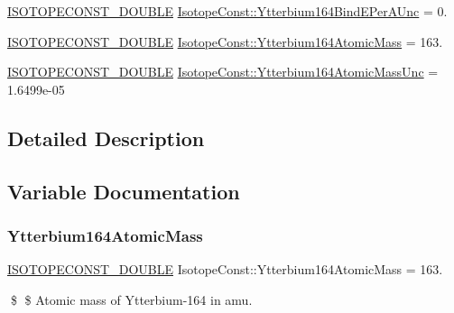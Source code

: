 \begin{DoxyCompactItemize}
\mbox{\hyperlink{group___isotope_const-_macros_ga8f45a7272ce02c0b4c65c44636ed719a}{I\+S\+O\+T\+O\+P\+E\+C\+O\+N\+S\+T\+\_\+\+D\+O\+U\+B\+LE}} \mbox{\hyperlink{group___isotope_const-_ytterbium-_yb164_ga0a419a6da4e8a57344887a1e27026556}{Isotope\+Const\+::\+Ytterbium164\+Bind\+E\+Per\+A\+Unc}} = 0.
\item 
\mbox{\hyperlink{group___isotope_const-_macros_ga8f45a7272ce02c0b4c65c44636ed719a}{I\+S\+O\+T\+O\+P\+E\+C\+O\+N\+S\+T\+\_\+\+D\+O\+U\+B\+LE}} \mbox{\hyperlink{group___isotope_const-_ytterbium-_yb164_gac416e391d66d0c9b3dede18a9cde2bfe}{Isotope\+Const\+::\+Ytterbium164\+Atomic\+Mass}} = 163.
\item 
\mbox{\hyperlink{group___isotope_const-_macros_ga8f45a7272ce02c0b4c65c44636ed719a}{I\+S\+O\+T\+O\+P\+E\+C\+O\+N\+S\+T\+\_\+\+D\+O\+U\+B\+LE}} \mbox{\hyperlink{group___isotope_const-_ytterbium-_yb164_ga458bb9645c65919cfa4270f1e741fdef}{Isotope\+Const\+::\+Ytterbium164\+Atomic\+Mass\+Unc}} = 1.\+6499e-\/05
\end{DoxyCompactItemize}


\subsection{Detailed Description}


\subsection{Variable Documentation}
\mbox{\label{group___isotope_const-_ytterbium-_yb164_gac416e391d66d0c9b3dede18a9cde2bfe}} 
\subsubsection{\texorpdfstring{Ytterbium164\+Atomic\+Mass}{Ytterbium164AtomicMass}}
{\footnotesize\ttfamily \mbox{\hyperlink{group___isotope_const-_macros_ga8f45a7272ce02c0b4c65c44636ed719a}{I\+S\+O\+T\+O\+P\+E\+C\+O\+N\+S\+T\+\_\+\+D\+O\+U\+B\+LE}} Isotope\+Const\+::\+Ytterbium164\+Atomic\+Mass = 163.}

\$ \$ Atomic mass of Ytterbium-\/164 in amu. \mbox{\label{group___isotope_const-_ytterbium-_yb164_ga458bb9645c65919cfa4270f1e741fdef}} 

